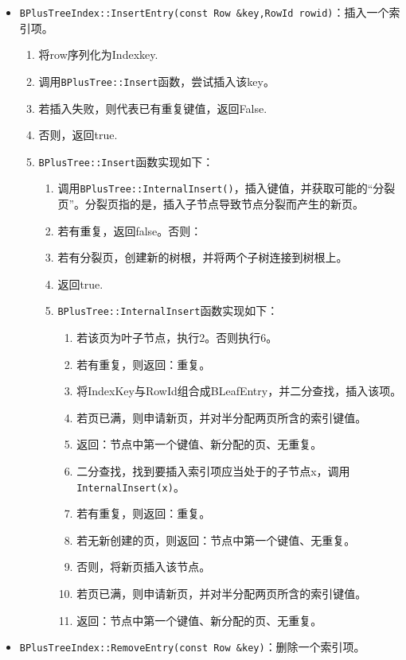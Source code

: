 \documentclass[12pt, a4paper]{article}
\def\c#1{\texttt{#1}}
\begin{document}
\begin{itemize}
  \item \c{BPlusTreeIndex::InsertEntry(const Row \&key,RowId rowid)}：插入一个索引项。\begin{enumerate}
    \item 将row序列化为Indexkey.
    \item 调用\c{BPlusTree::Insert}函数，尝试插入该key。
    \item 若插入失败，则代表已有重复键值，返回False.
    \item 否则，返回true.
    \item \c{BPlusTree::Insert}函数实现如下：\begin{enumerate}
      \item 调用\c{BPlusTree::InternalInsert()}，插入键值，并获取可能的“分裂页”。分裂页指的是，插入子节点导致节点分裂而产生的新页。
      \item 若有重复，返回false。否则：
      \item 若有分裂页，创建新的树根，并将两个子树连接到树根上。
      \item 返回true.
      \item \c{BPlusTree::InternalInsert}函数实现如下：\begin{enumerate}
        \item 若该页为叶子节点，执行2。否则执行6。
        \item 若有重复，则返回：重复。
        \item 将IndexKey与RowId组合成BLeafEntry，并二分查找，插入该项。
        \item 若页已满，则申请新页，并对半分配两页所含的索引键值。
        \item 返回：节点中第一个键值、新分配的页、无重复。
        \item 二分查找，找到要插入索引项应当处于的子节点x，调用\c{InternalInsert(x)}。
        \item 若有重复，则返回：重复。
        \item 若无新创建的页，则返回：节点中第一个键值、无重复。
        \item 否则，将新页插入该节点。
        \item 若页已满，则申请新页，并对半分配两页所含的索引键值。
        \item 返回：节点中第一个键值、新分配的页、无重复。
      \end{enumerate}
    \end{enumerate}
  \end{enumerate}
  \item \c{BPlusTreeIndex::RemoveEntry(const Row \&key)}：删除一个索引项。\begin{enumerate}

\end{enumerate}
\end{itemize}
\end{document}
